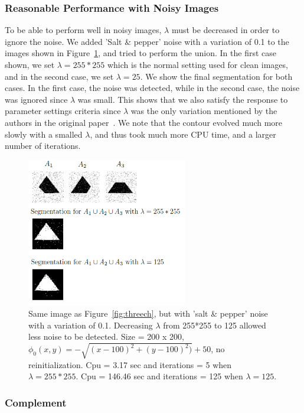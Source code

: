 \documentclass[10pt,twocolumn,letterpaper]{article}
\begin{document}
\subsubsection*{Reasonable Performance with Noisy Images}

To be able to perform well in noisy images, $\lambda$ must be decreased in order to ignore the noise. We added 'Salt \& pepper' noise with a variation of 0.1 to
the images shown in Figure~\ref{fig:sc_noisy}, and tried to perform the union. In the first case shown, we set $\lambda = 255*255$ which is the normal setting
used for clean images, and in the second case, we set $\lambda = 25$. We show the final segmentation for both cases. In the first case, the noise was detected,
while in the second case, the noise was ignored since $\lambda$ was small. This shows that we also satisfy the response to parameter settings criteria since
$\lambda$ was the only variation mentioned by the authors in the original paper~\cite{sandberg2005logic}. We note that the contour evolved much more slowly
with a smalled $\lambda$, and thus took much more CPU time, and a larger number of iterations.

\begin{figure}[t]
\centering
\includegraphics[width=7cm]{sc_noisy.png}
\caption{Same image as Figure~\ref{fig:threech}, but with 'salt \& pepper' noise with a variation of 0.1. Decreasing $\lambda$ from 255*255 to 125 allowed less
noise to be detected. Size = 200 x 200, $\phi_{0}(x,y) = - \sqrt{(x - 100)^2 + (y - 100)^2)} +
50$, no reinitialization. Cpu = 3.17 sec and iterations = 5 when $\lambda = 255*255$. Cpu = 146.46 sec and iterations = 125 when $\lambda =
125$.}
\label{fig:sc_noisy}
\end{figure}

\subsubsection*{Complement}
\end{document}
